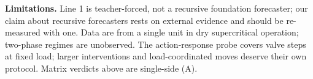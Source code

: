 \documentclass{article}
\begin{document}
\textbf{Limitations.} Line 1 is teacher-forced, not a recursive foundation forecaster;
our claim about recursive forecasters rests on external evidence
\cite{wan2026forecast} and should be re-measured with one. Data are from a single unit
in dry supercritical operation; two-phase regimes are unobserved. The action-response
probe covers valve steps at fixed load; larger interventions and load-coordinated
moves deserve their own protocol. Matrix verdicts above are single-side (A).



\end{document}

